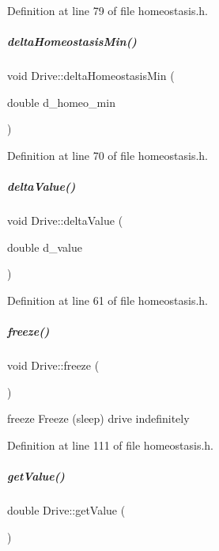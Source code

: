 Definition at line 79 of file homeostasis.\+h.

\mbox{\label{group__homeostasis_a8e2c37a5788ce4ad36c7158dc4a38d12}} 
\subparagraph{\texorpdfstring{delta\+Homeostasis\+Min()}{deltaHomeostasisMin()}}
{\footnotesize\ttfamily void Drive\+::delta\+Homeostasis\+Min (\begin{DoxyParamCaption}\item[{double}]{d\+\_\+homeo\+\_\+min }\end{DoxyParamCaption})\hspace{0.3cm}{\ttfamily [inline]}}



Definition at line 70 of file homeostasis.\+h.

\mbox{\label{group__homeostasis_a2f4190860384dcba745f87af3951dd60}} 
\subparagraph{\texorpdfstring{delta\+Value()}{deltaValue()}}
{\footnotesize\ttfamily void Drive\+::delta\+Value (\begin{DoxyParamCaption}\item[{double}]{d\+\_\+value }\end{DoxyParamCaption})\hspace{0.3cm}{\ttfamily [inline]}}



Definition at line 61 of file homeostasis.\+h.

\mbox{\label{group__homeostasis_a0e72e89b7ba3550d055eabf2106cb051}} 
\subparagraph{\texorpdfstring{freeze()}{freeze()}}
{\footnotesize\ttfamily void Drive\+::freeze (\begin{DoxyParamCaption}{ }\end{DoxyParamCaption})\hspace{0.3cm}{\ttfamily [inline]}}



freeze Freeze (sleep) drive indefinitely 



Definition at line 111 of file homeostasis.\+h.

\mbox{\label{group__homeostasis_a887538b6478fc6cc8d2e02856264e79f}} 
\subparagraph{\texorpdfstring{get\+Value()}{getValue()}}
{\footnotesize\ttfamily double Drive\+::get\+Value (\begin{DoxyParamCaption}{ }\end{DoxyParamCaption})\hspace{0.3cm}{\ttfamily [inline]}}



